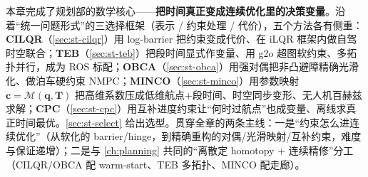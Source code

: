 本章完成了规划部的数学核心——\textbf{把时间真正变成连续优化里的决策变量}。沿着“统一问题形式”的三选择框架（表示 / 约束处理 / 代价），五个方法各有侧重：\textbf{CILQR}（\cref{sec:st-cilqr}）用 log-barrier 把约束变成代价、在 iLQR 框架内做自驾时空联合；\textbf{TEB}（\cref{sec:st-teb}）把段时间显式作变量、用 g2o 超图软约束、多拓扑并行，成为 ROS 标配；\textbf{OBCA}（\cref{sec:st-obca}）用强对偶把非凸避障精确光滑化、做泊车硬约束 NMPC；\textbf{MINCO}（\cref{sec:st-minco}）用参数映射 $\mathbf c=\mathcal M(\mathbf q,\mathbf T)$ 把高维系数压成低维航点+段时间、时空同步变形、无人机百赫兹求解；\textbf{CPC}（\cref{sec:st-cpc}）用互补进度约束让“何时过航点”也成变量、离线求真正时间最优。\cref{sec:st-select} 给出选型。贯穿全章的两条主线：一是“约束怎么进连续优化”（从软化的 barrier/hinge，到精确重构的对偶/光滑映射/互补约束，难度与保证递增）；二是与 \cref{ch:planning} 共同的“离散定 homotopy + 连续精修”分工（CILQR/OBCA 配 warm-start、TEB 多拓扑、MINCO 配走廊）。

